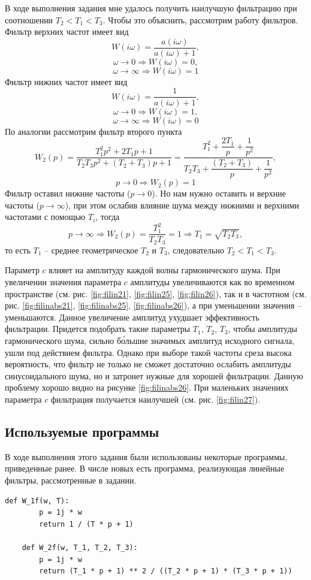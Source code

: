 \documentclass[a4paper, 12pt]{article}
\begin{document}
    
    В ходе выполнения задания мне удалось получить наилучшую фильтрацию при соотношении
    $T_2<T_1<T_3$. Чтобы это объяснить, рассмотрим работу фильтров. Фильтр верхних частот имеет вид
    $$
    W(i\omega)=\dfrac{a(i\omega)}{a(i\omega)+1},
    $$
    \vspace{-3mm}
    $$\omega\rightarrow0\Rightarrow W(i\omega)=0,$$
    $$\omega\rightarrow\infty\Rightarrow W(i\omega)=1$$
    Фильтр нижних частот имеет вид
    $$
    W(i\omega)=\dfrac{1}{a(i\omega)+1},
    $$
    \vspace{-4.5mm}
    $$\omega\rightarrow0\Rightarrow W(i\omega)=1,$$
    $$\omega\rightarrow\infty\Rightarrow W(i\omega)=0$$
    По аналогии рассмотрим фильтр второго пункта
    $$W_2(p)=\dfrac{T_1^2p^2+2T_1p+1}{T_2T_3p^2+\left(T_2+T_3\right)p+1}=\dfrac{T_1^2+\dfrac{2T_1}{p} +\dfrac{1}{p^2}}{T_2T_3 + \dfrac{(T_2+T_3)}{p} + \dfrac{1}{p^2}},$$
    $$p\rightarrow0\Rightarrow W_2(p)=1$$
    Фильтр оставил нижние частоты ($p\rightarrow0$). Но нам нужно оставить и верхние частоты ($p\rightarrow\infty$), при этом ослабив влияние шума между нижними и верхними частотами с помощью $T_i$, тогда
    $$p\rightarrow\infty\Rightarrow W_2(p)=\dfrac{T_1^2}{T_2T_3}=1\Rightarrow T_1=\sqrt{T_2T_3},$$
    то есть $T_1$ -- среднее геометрическое $T_2\text{ и }T_3$, следовательно $T_2<T_1<T_3$.


    Параметр $c$ влияет на амплитуду каждой волны гармонического шума. При увеличении значения параметра $c$ амплитуды увеличиваются
    как во временном пространстве (см. рис. \ref{fig:filin21}, \ref{fig:filin25}, \ref{fig:filin26}), так и в частотном
    (см. рис. \ref{fig:filinabs21}, \ref{fig:filinabs25}, \ref{fig:filinabs26}), а при уменьшении значения -- уменьшаются.
    Данное увеличение амплитуд ухудшает эффективность фильтрации. Придется подобрать такие параметры $T_1,\,T_2,\,T_3$,
    чтобы амплитуды гармонического шума, сильно б\'{о}льшие значимых амплитуд исходного сигнала, ушли под действием фильтра.
    Однако при выборе такой частоты среза высока вероятность, что фильтр не только не сможет достаточно ослабить амплитуды
    синусоидального шума, но и затронет нужные для хорошей фильтрации. Данную проблему хорошо видно на рисунке \ref{fig:filinabs26}.
    При маленьких значениях параметра $c$ фильтрация получается наилучшей (см. рис. \ref{fig:filin27}).


    \subsection{Используемые программы}
    В ходе выполнения этого задания были использованы некоторые программы, приведенные ранее. В числе новых есть программа,
    реализующая линейные фильтры, рассмотренные в задании.
    \begin{lstlisting}[label=c2, caption={Программа, содержащая реализацию линейных фильтров}]
    def W_1f(w, T):
        p = 1j * w
        return 1 / (T * p + 1)
    
    def W_2f(w, T_1, T_2, T_3):
        p = 1j * w
        return (T_1 * p + 1) ** 2 / ((T_2 * p + 1) * (T_3 * p + 1))
    \end{lstlisting}
\end{document}
